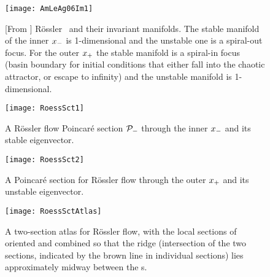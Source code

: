 \begin{figure}
  \texttt{[image: AmLeAg06Im1]}
    \caption{[From ]
R\"ossler \eqva\ and their invariant manifolds. The stable manifold of
the inner {\eqv} $x_{-}$  is 1-dimensional and the unstable one is a
spiral-out focus. For the outer {\eqv} $x_{+}$  the stable manifold is
a spiral-in focus (basin boundary for initial conditions that either fall
into the chaotic attractor, or escape to infinity) and the unstable
manifold is 1-dimensional.
    }
\label{fig:AmLeAg06Im1}
\end{figure}

\begin{figure}%
\begin{center}
  \texttt{[image: RoessSct1]}
\end{center}
  \caption{\label{fig:RoessSct1}
  A R\"ossler flow Poincar\'e section ${\cal P}_{-}$ through the inner
  {\eqv} $x_{-}$ and its stable eigenvector.
}
\end{figure}

\begin{figure}%
\begin{center}
  \texttt{[image: RoessSct2]}
\end{center}
  \caption[R\"ossler section, outer {\eqv}]{
  A Poincar\'e section for R\"ossler flow
      through the
      outer
  {\eqv} $x_{+}$  and its unstable eigenvector.
  } \label{fig:RoessSct2}
\end{figure}

\begin{figure}%
\begin{center}
  \texttt{[image: RoessSctAtlas]}
\end{center}
  \caption{
  A two-section atlas for R\"ossler flow, with the local sections of
   oriented and combined so that the ridge (intersection
  of the two sections, indicated by the brown line in individual
  sections) lies  approximately midway between the \template s.
  } \label{fig:RoessSctAtlas}
\end{figure}


